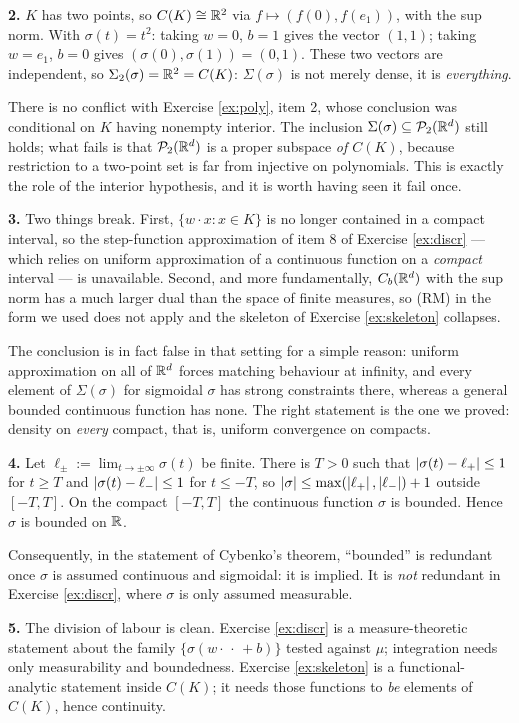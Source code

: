 \documentclass[11pt,a4paper]{article}
\begin{document}
\textbf{2.} $K$ has two points, so $C(K)\cong\mathbb{R}^2$ via $f\mapsto(f(0),f(e_1))$, with the sup norm.
With $\sigma(t) = t^2$: taking $w = 0$, $b=1$ gives the vector $(1,1)$; taking $w = e_1$, $b = 0$
gives $(\sigma(0),\sigma(1)) = (0,1)$. These two vectors are independent, so
$\Sigma_2(\sigma) = \mathbb{R}^2 = C(K)$: $\Sigma(\sigma)$ is not merely dense, it is \emph{everything}.

There is no conflict with Exercise \ref{ex:poly}, item 2, whose conclusion was conditional on $K$
having nonempty interior. The inclusion $\Sigma(\sigma)\subseteq\mathcal{P}_2(\mathbb{R}^d)$ still holds; what fails
is that $\mathcal{P}_2(\mathbb{R}^d)$ is a proper subspace \emph{of $C(K)$}, because restriction to a two-point set
is far from injective on polynomials. This is exactly the role of the interior hypothesis, and it is
worth having seen it fail once.

\textbf{3.} Two things break. First, $\{w\cdot x : x\in K\}$ is no longer contained in a compact
interval, so the step-function approximation of item 8 of Exercise \ref{ex:discr} --- which relies on
uniform approximation of a continuous function on a \emph{compact} interval --- is unavailable.
Second, and more fundamentally, $C_b(\mathbb{R}^d)$ with the sup norm has a much larger dual than the space
of finite measures, so (RM) in the form we used does not apply and the skeleton of Exercise
\ref{ex:skeleton} collapses.

The conclusion is in fact false in that setting for a simple reason: uniform approximation on all of
$\mathbb{R}^d$ forces matching behaviour at infinity, and every element of $\Sigma(\sigma)$ for sigmoidal
$\sigma$ has strong constraints there, whereas a general bounded continuous function has none. The
right statement is the one we proved: density on \emph{every} compact, that is, uniform convergence
on compacts.

\textbf{4.} Let $\ell_\pm := \lim_{t\to\pm\infty}\sigma(t)$ be finite. There is $T>0$ such that
$\left\lvert \sigma(t) - \ell_+ \right\rvert\le1$ for $t\ge T$ and $\left\lvert \sigma(t)-\ell_- \right\rvert\le1$ for $t\le-T$, so
$\left\lvert \sigma \right\rvert\le\max(\left\lvert \ell_+ \right\rvert,\left\lvert \ell_- \right\rvert)+1$ outside $[-T,T]$. On the compact $[-T,T]$ the
continuous function $\sigma$ is bounded. Hence $\sigma$ is bounded on $\mathbb{R}$.

Consequently, in the statement of Cybenko's theorem, ``bounded'' is redundant once $\sigma$ is
assumed continuous and sigmoidal: it is implied. It is \emph{not} redundant in Exercise
\ref{ex:discr}, where $\sigma$ is only assumed measurable.

\textbf{5.} The division of labour is clean. Exercise \ref{ex:discr} is a measure-theoretic
statement about the family $\{\sigma(w\cdot{\,\cdot\,}+b)\}$ tested against $\mu$; integration needs
only measurability and boundedness. Exercise \ref{ex:skeleton} is a functional-analytic statement
inside $C(K)$; it needs those functions to \emph{be} elements of $C(K)$, hence continuity.
\end{document}
